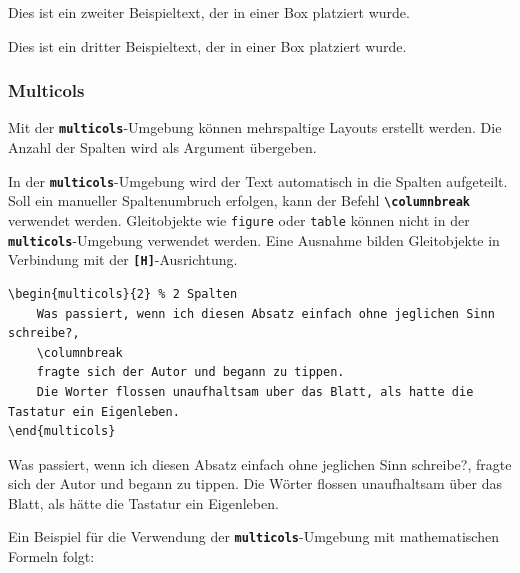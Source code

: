 \hfill
\parbox[t]{0.3\textwidth}{Dies ist ein zweiter Beispieltext, der in einer Box platziert wurde.}
\hfill
\colorbox{red!20}{\parbox[t]{0.3\textwidth}{Dies ist ein dritter Beispieltext, der in einer Box platziert wurde.}}

\subsubsection{Multicols}
Mit der \textbf{\texttt{multicols}}-Umgebung können mehrspaltige Layouts erstellt werden. Die Anzahl der Spalten wird als Argument übergeben.

In der \textbf{\texttt{multicols}}-Umgebung wird der Text automatisch in die Spalten aufgeteilt. Soll ein manueller Spaltenumbruch erfolgen, kann der Befehl \textbf{\texttt{\textbackslash columnbreak}} verwendet werden. Gleitobjekte wie \texttt{figure} oder \texttt{table} können nicht in der \textbf{\texttt{multicols}}-Umgebung verwendet werden. Eine Ausnahme bilden Gleitobjekte in Verbindung mit der \textbf{\texttt{[H]}}-Ausrichtung.

\begin{minipage}[c]{0.58\textwidth}
    \begin{lstlisting}[language={[LaTeX]TeX}, basicstyle=\small]
\begin{multicols}{2} % 2 Spalten
    Was passiert, wenn ich diesen Absatz einfach ohne jeglichen Sinn schreibe?,
    \columnbreak
    fragte sich der Autor und begann zu tippen. 
    Die Worter flossen unaufhaltsam uber das Blatt, als hatte die Tastatur ein Eigenleben.
\end{multicols}
    \end{lstlisting}
\end{minipage}
\hfill
\begin{minipage}[c]{0.38\textwidth}
    \begin{multicols}{2} %
        Was passiert, wenn ich diesen Absatz einfach ohne jeglichen Sinn schreibe?,
        \columnbreak
        fragte sich der Autor und begann zu tippen.
        Die Wörter flossen unaufhaltsam über das Blatt, als hätte die Tastatur ein Eigenleben.
    \end{multicols}
\end{minipage}

Ein Beispiel für die Verwendung der \textbf{\texttt{multicols}}-Umgebung mit mathematischen Formeln folgt:


